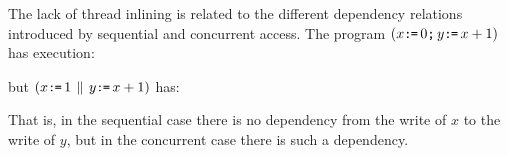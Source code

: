 The lack of thread inlining is related to the different dependency
relations introduced by sequential and concurrent access.
The program
\begin{math}
  (x\texttt{:}\mkern-1mu\texttt{=}\, 0\texttt{;}\,\allowbreak y\texttt{:}\mkern-1mu\texttt{=}\, x+1)
\end{math}
has execution:
\begin{tikzdisplay}[node distance=1em]
\end{tikzdisplay}
but
\begin{math}
  (x\texttt{:}\mkern-1mu\texttt{=}\, 1\,\mathbin{\|}\, y\texttt{:}\mkern-1mu\texttt{=}\, x+1)
\end{math}
has:
\begin{tikzdisplay}[node distance=1em]
\end{tikzdisplay}
That is, in the sequential case there is no dependency from the
write of $x$ to the write of $y$, but in the concurrent case there
is such a dependency.

